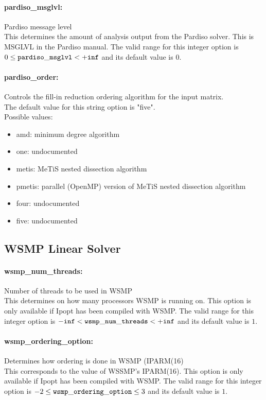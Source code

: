 \paragraph{pardiso\_msglvl:}\label{opt:pardiso_msglvl} Pardiso message level \\
 This determines the amount of analysis output from the Pardiso solver. This is MSGLVL in the Pardiso manual. The valid range for this integer option is
$0 \le {\tt pardiso\_msglvl } <  {\tt +inf}$
and its default value is $0$.


\paragraph{pardiso\_order:}\label{opt:pardiso_order} Controls the fill-in reduction ordering algorithm for the input matrix. \\
 The default value for this string option is "five".
\\ 
Possible values:
\begin{itemize}
   \item amd: minimum degree algorithm
   \item one: undocumented
   \item metis: MeTiS nested dissection algorithm
   \item pmetis: parallel (OpenMP) version of MeTiS nested dissection algorithm
   \item four: undocumented
   \item five: undocumented
\end{itemize}


\subsection{WSMP Linear Solver}

\paragraph{wsmp\_num\_threads:}\label{opt:wsmp_num_threads} Number of threads to be used in WSMP  \\
 This determines on how many processors WSMP is
running on.  This option is only available if
Ipopt has been compiled with WSMP. The valid range for this integer option is
${\tt -inf} <  {\tt wsmp\_num\_threads } <  {\tt +inf}$
and its default value is $1$.


\paragraph{wsmp\_ordering\_option:}\label{opt:wsmp_ordering_option} Determines how ordering is done in WSMP (IPARM(16)  \\
 This corresponds to the value of WSSMP's
IPARM(16).  This option is only available if
Ipopt has been compiled with WSMP. The valid range for this integer option is
$-2 \le {\tt wsmp\_ordering\_option } \le 3$
and its default value is $1$.


